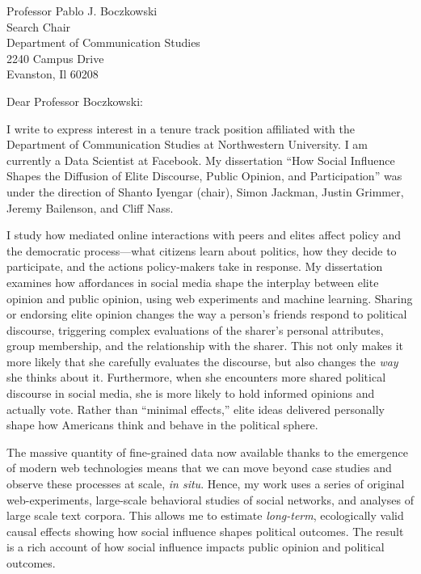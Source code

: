 \documentclass[fontsize=12pt, paper=a4]{scrlttr2}
\date{October 6, 2014}
\begin{document}
\enlargethispage{2\baselineskip}

\begin{letter}{Professor Pablo J. Boczkowski\\
Search Chair\\
Department of Communication Studies\\
2240 Campus Drive\\
Evanston, Il 60208}

\opening{Dear Professor Boczkowski:}  %

I write to express interest in a tenure track position affiliated with the Department of Communication Studies at Northwestern University.  I am currently a Data Scientist at Facebook.  %
My dissertation ``How Social Influence Shapes the Diffusion of Elite Discourse, Public Opinion, and Participation'' was under the direction of Shanto Iyengar (chair), Simon Jackman, Justin Grimmer, Jeremy Bailenson, and Cliff Nass.

I study how mediated online interactions with peers and elites affect policy and the democratic process---what citizens learn about politics, how they decide to participate, and the actions policy-makers take in response.  My dissertation examines how affordances in social media shape the interplay between elite opinion and public opinion, using web experiments and machine learning.  Sharing or endorsing elite opinion changes the way a person's friends respond to political discourse, triggering complex evaluations of the sharer's personal attributes, group membership, and the relationship with the sharer.  This not only makes it more likely that she carefully evaluates the discourse, but also changes the \emph{way} she thinks about it.  Furthermore, when she encounters more shared political discourse in social media, she is more likely to hold informed opinions and actually vote.  Rather than ``minimal effects,'' elite ideas delivered personally shape how Americans think and behave in the political sphere.

The massive quantity of fine-grained data now available thanks to the emergence of modern web technologies means that we can move beyond case studies and observe these processes at scale, \emph{in situ}.  Hence, my work uses a series of original web-experiments, large-scale behavioral studies of social networks, and analyses of large scale text corpora.  This allows me to estimate \emph{long-term}, ecologically valid causal effects showing how social influence shapes political outcomes.  The result is a rich account of how social influence impacts public opinion and political outcomes.  


\end{letter}
\end{document}
